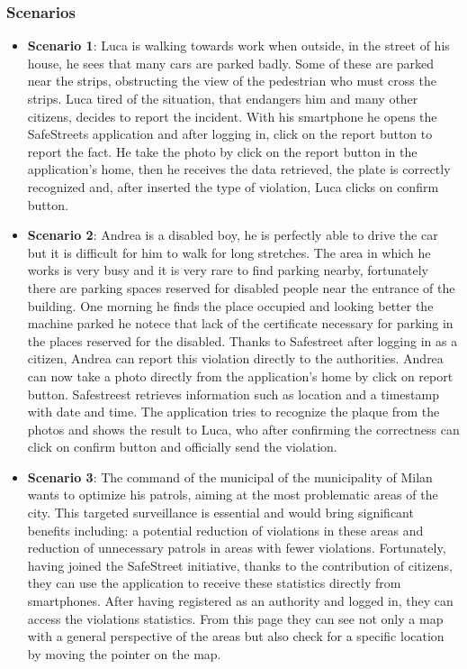 \documentclass{article}
\begin{document}
\subsubsection{Scenarios}
\begin{itemize}
    \item \textbf{Scenario 1}:
    Luca is walking towards work when outside, in the street of his house, he sees that many cars are parked badly. 
    Some of these are parked near the strips, obstructing the view of the pedestrian who must cross the strips. 
    Luca tired of the situation, that endangers him and many other citizens, decides to report the incident. 
    With his smartphone he opens the SafeStreets application and after logging in, click on the report button to report the fact. 
    He take the photo by click on the report button in the application's home, then he receives the data retrieved, the plate is correctly 
    recognized and, after inserted the type of violation, Luca clicks on confirm button.

    \item \textbf{Scenario 2}:
    Andrea is a disabled boy, he is perfectly able to drive the car but it is difficult for him to walk for long stretches. 
    The area in which he works is very busy and it is very rare to find parking nearby, fortunately there are parking 
    spaces reserved for disabled people near the entrance of the building. One morning he finds the place occupied and looking 
    better the machine parked he notece that lack of the certificate necessary for parking in the places reserved for the disabled. 
    Thanks to Safestreet after logging in as a citizen, Andrea can report this violation directly to the authorities. 
    Andrea can now take a photo directly from the application's home by click on report button. Safestreest retrieves information such as 
    location and a timestamp with date and time. The application tries to recognize the plaque from the photos and shows the result to Luca, 
    who after confirming the correctness can click on confirm button and officially send the violation.

    \item \textbf{Scenario 3}:
    The command of the municipal of the municipality of Milan wants to optimize his patrols, aiming at the most problematic areas of the city.
    This targeted surveillance is essential and would bring significant benefits including: a potential reduction of violations in these areas
    and reduction of unnecessary patrols in areas with fewer violations. Fortunately, having joined the SafeStreet initiative, thanks to the 
    contribution of citizens, they can use the application to receive these statistics directly from smartphones. After having 
    registered as an authority and logged in, they can access the violations statistics. From this page they can see not only a map with a general
    perspective of the areas but also check for a specific location by moving the pointer on the map.  


\end{itemize}
\end{document}
